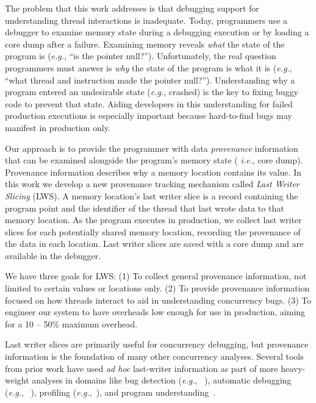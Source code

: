 \documentclass[10pt,nocopyrightspace]{sigplanconf}
\newcommand{\lws}{LWS\xspace}
\newcommand{\lwsfull}{Last Writer Slicing\xspace}
\begin{document}
The problem that this work addresses is that debugging support for
understanding thread interactions is inadequate.  Today, programmers use a
debugger to examine memory state during a debugging execution or by loading a
core dump after a failure.  Examining memory reveals {\em what} the state of
the program is ({\em e.g.}, ``is the pointer null?'').  Unfortunately, the real
question programmers must answer is {\em why} the state of the program is what
it is ({\em e.g.}, ``what thread and instruction made the pointer null?'').
Understanding why a program entered an undesirable state ({\em e.g.}, crashed)
is the key to fixing buggy code to prevent that state.  Aiding developers in
this understanding for failed production executions is especially important
because hard-to-find bugs may manifest in production only.



Our approach is to provide the programmer with data {\em provenance}
information that can be examined alongside the program's memory state ({\em
i.e.}, core dump).  Provenance information describes why a memory location
contains its value.  In this work we develop a new provenance tracking
mechanism called {\em \lwsfull} (\lws).  A memory location's last writer slice is a
record containing the program point and the identifier of the thread that last
wrote data to that memory location.  As the program executes in production, we
collect last writer slices for each potentially shared memory location,
recording the provenance of the data in each location.  Last writer slices are
saved with a core dump and are available in the debugger.

We have three goals for \lws:  (1) To collect general provenance information,
not limited to certain values or locations only. (2) To provide provenance
information focused on how threads interact to aid in understanding concurrency
bugs. (3) To engineer our system to have overheads low enough for use in
production, aiming for a 10 -- 50\% maximum overhead. 

Last writer slices are primarily useful for concurrency debugging, but
provenance information is the foundation of many other concurrency analyses.
Several tools from prior work have used {\em ad hoc} last-writer information as
part of more heavy-weight analyses in domains like bug detection ({\em e.g.},
~\cite{dmtracker,avio}), automatic debugging ({\em e.g.},
~\cite{recon,conseq,cci}), profiling ({\em e.g.},~\cite{threadclustering,
schedpredictionmodel}), and program understanding~\cite{oshatr}. 
\end{document}
